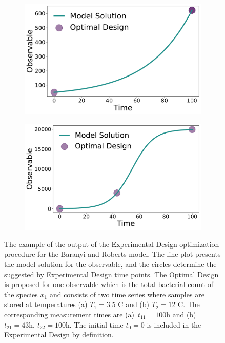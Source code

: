 \documentclass[graybox]{svmult}
\begin{document}
\begin{figure}[H]
    \begin{subfigure}{.5\textwidth}
        \centering
        \includegraphics[scale=0.255]{Figures/Fig3a.pdf}
    \end{subfigure}
    \begin{subfigure}{.5\textwidth}
        \centering
        \includegraphics[scale=0.255]{Figures/Fig3b.pdf}
    \end{subfigure}
    \caption{The example of the output of the Experimental Design optimization procedure for the Baranyi and Roberts model.
    The line plot presents the model solution for the observable, and the circles determine the suggested by Experimental Design time points.
    The Optimal Design is proposed for one observable which is the total bacterial count of the species $x_1$ and consists of two time series where samples are stored at temperatures (a) $T_1 = 3.5^\circ$C and (b) $T_2 = 12^\circ$C.
    The corresponding measurement times are (a)~$t_{11}=100$h and (b)~$t_{21}=43$h, $t_{22}=100$h.
    The initial time $t_0=0$ is included in the Experimental Design by definition.}
    \label{Fig3}
\end{figure}
\end{document}
